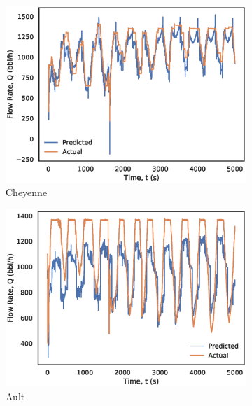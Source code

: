 \begin{figure}
    \centering
    \begin{subfigure}[b]{0.32\textwidth}
         \centering
         \includegraphics[width=\textwidth]{images/08Chey_Pconst.eps}
         \caption{Cheyenne}
         \label{fig:08Chey_Pconst}
    \end{subfigure}
    \begin{subfigure}[b]{0.32\textwidth}
         \centering
         \includegraphics[width=\textwidth]{images/08Ault_Pconst.eps}
         \caption{Ault}
         \label{fig:08Ault_Pconst}
    \end{subfigure}
    \begin{subfigure}[b]{0.32\textwidth}
         \centering

\end{subfigure}
\end{figure}
